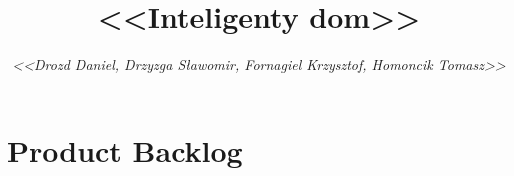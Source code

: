 \documentclass[a4paper,12pt]{article}
\title{\bf{<<Inteligenty dom>>}}
\author{{\em <<Drozd Daniel, Drzyzga Sławomir, Fornagiel Krzysztof, Homoncik Tomasz>>}}
\date{}
\begin{document}
	
	
	\tableofcontents
	\thispagestyle{empty}
	
	
	
	\section{Product Backlog}
	
		

	
	
	
	
\end{document}
